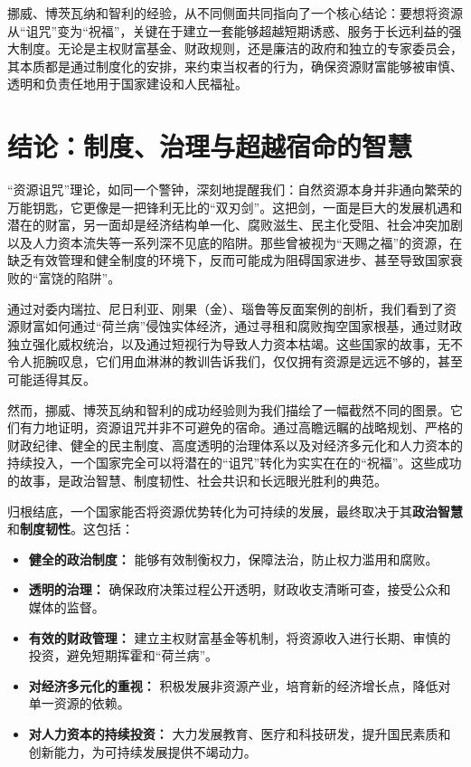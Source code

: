 挪威、博茨瓦纳和智利的经验，从不同侧面共同指向了一个核心结论：要想将资源从“诅咒”变为“祝福”，关键在于建立一套能够超越短期诱惑、服务于长远利益的强大制度。无论是主权财富基金、财政规则，还是廉洁的政府和独立的专家委员会，其本质都是通过制度化的安排，来约束当权者的行为，确保资源财富能够被审慎、透明和负责任地用于国家建设和人民福祉。

\section{结论：制度、治理与超越宿命的智慧}

“资源诅咒”理论，如同一个警钟，深刻地提醒我们：自然资源本身并非通向繁荣的万能钥匙，它更像是一把锋利无比的“双刃剑”。这把剑，一面是巨大的发展机遇和潜在的财富，另一面却是经济结构单一化、腐败滋生、民主化受阻、社会冲突加剧以及人力资本流失等一系列深不见底的陷阱。那些曾被视为“天赐之福”的资源，在缺乏有效管理和健全制度的环境下，反而可能成为阻碍国家进步、甚至导致国家衰败的“富饶的陷阱”。

通过对委内瑞拉、尼日利亚、刚果（金）、瑙鲁等反面案例的剖析，我们看到了资源财富如何通过“荷兰病”侵蚀实体经济，通过寻租和腐败掏空国家根基，通过财政独立强化威权统治，以及通过短视行为导致人力资本枯竭。这些国家的故事，无不令人扼腕叹息，它们用血淋淋的教训告诉我们，仅仅拥有资源是远远不够的，甚至可能适得其反。

然而，挪威、博茨瓦纳和智利的成功经验则为我们描绘了一幅截然不同的图景。它们有力地证明，资源诅咒并非不可避免的宿命。通过高瞻远瞩的战略规划、严格的财政纪律、健全的民主制度、高度透明的治理体系以及对经济多元化和人力资本的持续投入，一个国家完全可以将潜在的“诅咒”转化为实实在在的“祝福”。这些成功的故事，是政治智慧、制度韧性、社会共识和长远眼光胜利的典范。

归根结底，一个国家能否将资源优势转化为可持续的发展，最终取决于其\textbf{政治智慧}和\textbf{制度韧性}。这包括：

\begin{itemize}
    \item \textbf{健全的政治制度：} 能够有效制衡权力，保障法治，防止权力滥用和腐败。
    \item \textbf{透明的治理：} 确保政府决策过程公开透明，财政收支清晰可查，接受公众和媒体的监督。
    \item \textbf{有效的财政管理：} 建立主权财富基金等机制，将资源收入进行长期、审慎的投资，避免短期挥霍和“荷兰病”。
    \item \textbf{对经济多元化的重视：} 积极发展非资源产业，培育新的经济增长点，降低对单一资源的依赖。
    \item \textbf{对人力资本的持续投资：} 大力发展教育、医疗和科技研发，提升国民素质和创新能力，为可持续发展提供不竭动力。
\end{itemize}

